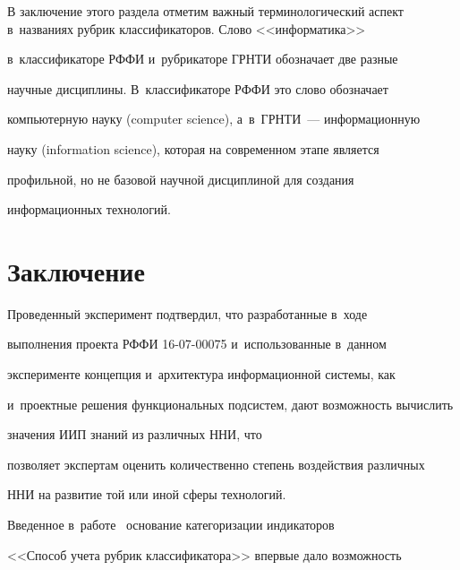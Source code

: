      


     В заключение этого раздела отметим важный терминологический аспект в~названиях рубрик классификаторов. Слово <<информатика>> 


в~классификаторе РФФИ и~рубрикаторе ГРНТИ обозначает две разные 


научные дисциплины. В~классификаторе РФФИ это слово обозначает 


компьютерную науку (computer science), а~в~ГРНТИ~--- информационную 


науку (information science), которая на современном этапе является 


профильной, но не базовой научной дисциплиной для создания 


информационных технологий.





\vspace*{-4pt}


     


\section{Заключение}





\vspace*{-2pt}


     


     Проведенный эксперимент подтвердил, что разработанные в~ходе 


выполнения проекта РФФИ 16-07-00075 и~использованные в~данном 


эксперименте концепция и~архитектура информационной системы, как 


и~проектные решения функциональных подсистем, дают возможность вычислить 


значения ИИП знаний из различных ННИ, что 


позволяет экспертам оценить количественно степень воздействия различных 


ННИ на развитие той или иной сферы технологий.


     


     Введенное в~работе~\cite{19-mm} основание категоризации индикаторов 


<<Способ учета рубрик классификатора>> впервые дало возможность 



